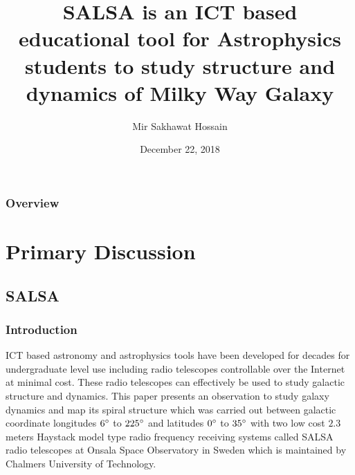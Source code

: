 \documentclass{beamer}
\title[SALSA]{SALSA is an ICT based educational tool for Astrophysics students to study structure and dynamics of Milky Way Galaxy } %
\author{Mir Sakhawat Hossain} %
\institute[KNGC] %
{
Kabi Nazrul Govt. College,Dhaka \\ %
\medskip
\textit{s.hossain18@gmail.com} \\ %
\textit{\url{https://gitlab.com/sakhawat18/iccit-2018}} %
}
\date{December 22, 2018} %
\begin{document}
\begin{frame}
\titlepage %
\end{frame}

\begin{frame}
\frametitle{Overview} %
\tableofcontents %
\end{frame}


\section{Primary Discussion} %

\subsection{SALSA} %

\begin{frame}
\frametitle{Introduction}
ICT based astronomy and astrophysics tools have been developed for decades for undergraduate level use including radio telescopes controllable over the Internet at minimal cost. These radio telescopes can effectively be used to study galactic structure and dynamics. This paper presents an observation to study galaxy dynamics and map its spiral structure which was carried out between galactic coordinate longitudes $6\degree$ to $225\degree$ and latitudes $0\degree$ to $35\degree$ with two low cost $2.3$ meters Haystack model type radio frequency receiving systems called SALSA radio telescopes at Onsala Space Observatory in Sweden which is maintained by Chalmers University of Technology.
\end{frame}
\end{document}
